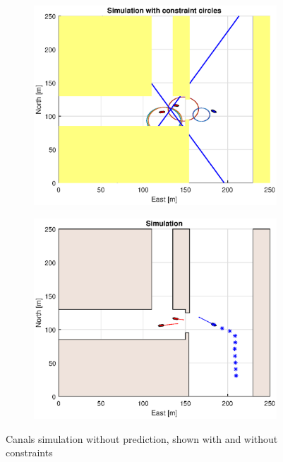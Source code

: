 \begin{figure}[ht]
    \hfill
    \\
    \begin{subfigure}[b]{0.49\textwidth}
        \centering
        \includegraphics[width=\textwidth]{Images/Figures/Havn1/Simple1_f1_Frame7}
    \end{subfigure}
    \hfill
    \begin{subfigure}[b]{0.499\textwidth}
        \centering
        \includegraphics[width=\textwidth]{Images/Figures/Havn1/Simple1_f600_Frame7}
    \end{subfigure}
    \hfill
    \caption{Canals simulation without prediction, shown with and without constraints}
\end{figure}

